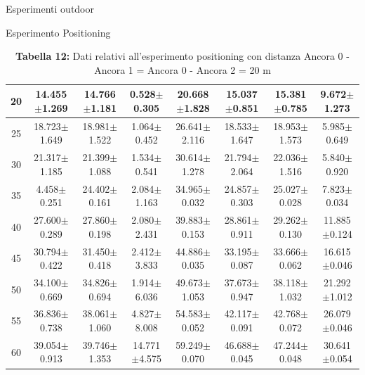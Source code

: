 \documentclass[12pt]{report}
\begin{document}
\begin{section}{Esperimenti outdoor}
\begin{subsection}{Esperimento Positioning}
\begin{table}[H]
{\begin{tabular}{|c||c|c|c||c|c|c|c||}
   					20&14.455$\pm$1.269&14.766$\pm$1.181&0.528$\pm$0.305&			20.668$\pm$1.828&15.037$\pm$0.851&15.381$\pm$0.785&9.672$\pm$1.273\\
					\hline
   					25&18.723$\pm$1.649&18.981$\pm$ 1.522&1.064$\pm$0.452&			26.641$\pm$2.116&18.533$\pm$1.647&18.953$\pm$1.573&5.985$\pm$0.649\\
					\hline
   					30&21.317$\pm$1.185&21.399$\pm$1.088&1.534$\pm$0.541&			30.614$\pm$1.278&21.794$\pm$2.064&22.036$\pm$1.516&5.840$\pm$0.920\\
					\hline
   					35&4.458$\pm$0.251&24.402$\pm$0.161&2.084$\pm$1.163&			34.965$\pm$0.032&24.857$\pm$0.303&25.027$\pm$0.028&7.823$\pm$0.034\\
					\hline
   					40&27.600$\pm$0.289&27.860$\pm$0.198&2.080$\pm$2.431&			39.883$\pm$0.153&28.861$\pm$0.911&29.262$\pm$0.130&11.885$\pm$0.124\\
					\hline
   					45&30.794$\pm$0.422&31.450$\pm$0.418&2.412$\pm$3.833&			44.886$\pm$0.035&33.195$\pm$0.087&33.666$\pm$0.062&16.615$\pm$0.046\\
					\hline
   					50&34.100$\pm$0.669&34.826$\pm$0.694&1.914$\pm$6.036&			49.673$\pm$1.053&37.673$\pm$0.947&38.118$\pm$ 1.032&21.292$\pm$1.012\\
					\hline
   					55&36.836$\pm$0.738&38.061$\pm$1.060&4.827$\pm$8.008&			54.583$\pm$0.052&42.117$\pm$0.091&42.768$\pm$0.072&26.079$\pm$0.046\\
					\hline
   					60&39.054$\pm$0.913&39.746$\pm$1.353&14.771$\pm$4.575&		59.249$\pm$0.070&46.688$\pm$0.045&47.244$\pm$0.048&30.641$\pm$0.054\\
					\hline
				\end{tabular}
}
				\caption{\textbf{Tabella 12:} Dati relativi all'esperimento positioning con distanza Ancora 0 - Ancora 1 = Ancora 0 - Ancora 2 = 20 m\label{EspOut20}}
			\end{table}


\end{subsection}
\end{section}
\end{document}
